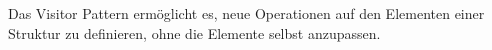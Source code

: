 \glqq Das Visitor Pattern ermöglicht es, neue Operationen auf den Elementen einer Struktur zu definieren, ohne die Elemente selbst anzupassen.\grqq